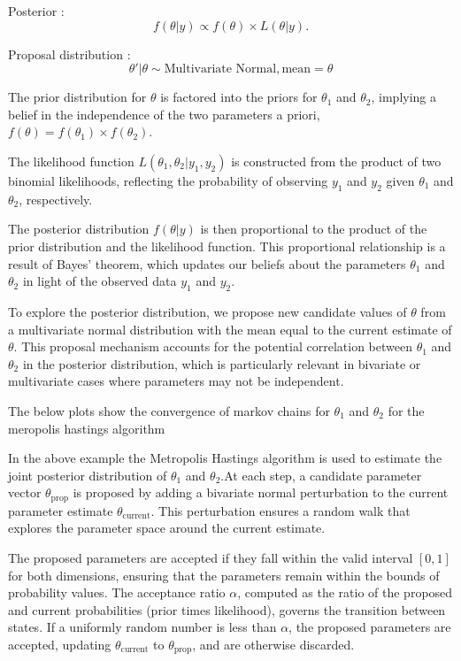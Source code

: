 Posterior :
\[
f(\theta | y) \propto f(\theta) \times L(\theta | y).
\]

Proposal distribution :
\[\theta' | \theta \sim \text{Multivariate Normal}, \text{mean} = \theta\]

The prior distribution for \( \theta \) is factored into the priors for \( \theta_1 \) and \( \theta_2 \), implying a belief in the independence of the two parameters a priori, \( f(\theta) = f(\theta_1) \times f(\theta_2) \).

The likelihood function \( L(\theta_1, \theta_2 | y_1, y_2) \) is constructed from the product of two binomial likelihoods, reflecting the probability of observing \( y_1 \) and \( y_2 \) given \( \theta_1 \) and \( \theta_2 \), respectively.

The posterior distribution \( f(\theta | y) \) is then proportional to the product of the prior distribution and the likelihood function. This proportional relationship is a result of Bayes' theorem, which updates our beliefs about the parameters \( \theta_1 \) and \( \theta_2 \) in light of the observed data \( y_1 \) and \( y_2 \).

To explore the posterior distribution, we propose new candidate values of \( \theta \) from a multivariate normal distribution with the mean equal to the current estimate of \( \theta \). This proposal mechanism accounts for the potential correlation between \( \theta_1 \) and \( \theta_2 \) in the posterior distribution, which is particularly relevant in bivariate or multivariate cases where parameters may not be independent.

The below plots show the convergence of markov chains for \( \theta_1 \) and \( \theta_2 \) for the meropolis hastings algorithm

In the above example the Metropolis Hastings algorithm is used to estimate the joint posterior distribution of \( \theta_1 \) and \( \theta_2 \).At each step, a candidate parameter vector \( \theta_{\text{prop}} \) is proposed by adding a bivariate normal perturbation to the current parameter estimate \( \theta_{\text{current}} \). This perturbation ensures a random walk that explores the parameter space around the current estimate.

The proposed parameters are accepted if they fall within the valid interval \([0, 1]\) for both dimensions, ensuring that the parameters remain within the bounds of probability values. The acceptance ratio \( \alpha \), computed as the ratio of the proposed and current probabilities (prior times likelihood), governs the transition between states. If a uniformly random number is less than \( \alpha \), the proposed parameters are accepted, updating \( \theta_{\text{current}} \) to \( \theta_{\text{prop}} \), and are otherwise discarded.


